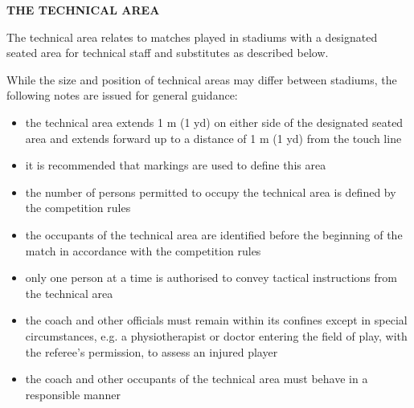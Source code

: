 \clearpage
\sffamily
{\bfseries\color[rgb]{0.4,0.4,0.4}
THE TECHNICAL AREA}

\bigskip

The technical area relates to matches played in stadiums with a designated seated area for technical staff and substitutes as described below.

\bigskip

While the size and position of technical areas may differ between stadiums, the following notes are issued for general guidance:

\begin{itemize}
\item the technical area extends 1 m (1 yd) on either side of the designated seated area and extends forward up to a distance of 1 m (1 yd) from the touch line
\item it is recommended that markings are used to define this area
\item the number of persons permitted to occupy the technical area is defined by the competition rules
\item the occupants of the technical area are identified before the beginning of the match in accordance with the competition rules
\item only one person at a time is authorised to convey tactical instructions from the technical area
\item the coach and other officials must remain within its confines except in special circumstances, e.g. a physiotherapist or doctor entering the field of play, with the referee's permission, to assess an injured player
\item the coach and other occupants of the technical area must behave in a responsible manner
\end{itemize}